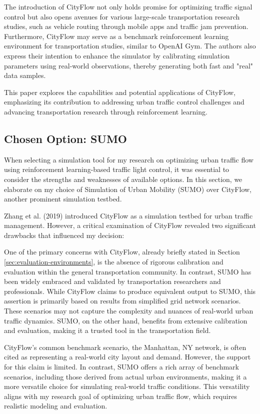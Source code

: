 The introduction of CityFlow not only holds promise for optimizing traffic signal control but also opens avenues for various large-scale transportation research studies, such as vehicle routing through mobile apps and traffic jam prevention. Furthermore, CityFlow may serve as a benchmark reinforcement learning environment for transportation studies, similar to OpenAI Gym. The authors also express their intention to enhance the simulator by calibrating simulation parameters using real-world observations, thereby generating both fast and "real" data samples.

This paper explores the capabilities and potential applications of CityFlow, emphasizing its contribution to addressing urban traffic control challenges and advancing transportation research through reinforcement learning.

\subsection{Chosen Option: SUMO}
When selecting a simulation tool for my research on optimizing urban traffic flow using reinforcement learning-based traffic light control, it was essential to consider the strengths and weaknesses of available options. In this section, we elaborate on my choice of Simulation of Urban Mobility (SUMO) over CityFlow, another prominent simulation testbed.

Zhang et al. (2019)\cite{zhang2019cityflow} introduced CityFlow as a simulation testbed for urban traffic management. However, a critical examination of CityFlow revealed two significant drawbacks that influenced my decision:

One of the primary concerns with CityFlow, already briefly stated in Section \ref{sec:evaluation-environments}, is the absence of rigorous calibration and evaluation within the general transportation community. In contrast, SUMO has been widely embraced and validated by transportation researchers and professionals. While CityFlow claims to produce equivalent output to SUMO, this assertion is primarily based on results from simplified grid network scenarios. These scenarios may not capture the complexity and nuances of real-world urban traffic dynamics. SUMO, on the other hand, benefits from extensive calibration and evaluation, making it a trusted tool in the transportation field.

CityFlow's common benchmark scenario, the Manhattan, NY network, is often cited as representing a real-world city layout and demand. However, the support for this claim is limited. In contrast, SUMO offers a rich array of benchmark scenarios, including those derived from actual urban environments, making it a more versatile choice for simulating real-world traffic conditions. This versatility aligns with my research goal of optimizing urban traffic flow, which requires realistic modeling and evaluation.

